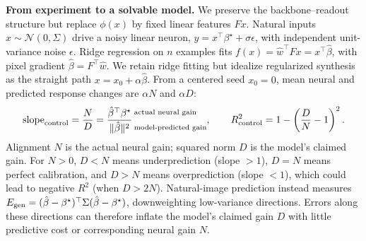 \documentclass[12pt,a4paper]{article}
\newcommand{\head}[1]{\par\noindent\textbf{#1}\enspace\ignorespaces}
\newcommand{\bh}{\hat\beta}
\newcommand{\bt}{\beta^\star}
\begin{document}
\head{From experiment to a solvable model.}
We preserve the backbone--readout structure but replace $\phi(x)$ by fixed linear features $Fx$. Natural inputs $x\sim\mathcal N(0,\Sigma)$ drive a noisy linear neuron, $y=x^\top\bt+\sigma\epsilon$, with independent unit-variance noise $\epsilon$. Ridge regression on $n$ examples fits $f(x)=\hat w^\top Fx=x^\top\bh$, with pixel gradient $\bh=F^\top\hat w$. We retain ridge fitting but idealize regularized synthesis as the straight path $x=x_0+\alpha\bh$. From a centered seed $x_0=0$, mean neural and predicted response changes are $\alpha N$ and $\alpha D$:
\begin{equation}
\mathrm{slope}_{\rm control}=\frac ND=
\frac{\bh^\top\bt}{\|\bh\|^2}\,
\begin{subarray}{l}
\text{actual neural gain}\\[8pt]
\text{model-predicted gain}
\end{subarray},
\qquad R^2_{\rm control}=1-\left(\frac DN-1\right)^2.
\label{eq:geometry}
\end{equation}
Alignment $N$ is the actual neural gain; squared norm $D$ is the model's claimed gain. For $N>0$, $D<N$ means underprediction (slope $>1$), $D=N$ means perfect calibration, and $D>N$ means overprediction (slope $<1$), which could lead to negative $R^2$ (when $D>2N$). Natural-image prediction instead measures $E_{\rm gen}=(\bh-\bt)^\top\Sigma(\bh-\bt)$, downweighting low-variance directions. Errors along these directions can therefore inflate the model's claimed gain $D$ with little predictive cost or corresponding neural gain $N$.
\end{document}
